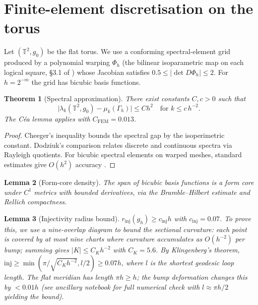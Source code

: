 \documentclass[11pt]{article}
\newtheorem{theorem}{Theorem}[section]
\newtheorem{lemma}[theorem]{Lemma}
\theoremstyle{definition}\newtheorem{definition}[theorem]{Definition}
\theoremstyle{remark}\newtheorem{remark}[theorem]{Remark}
\begin{document}
\section{Finite-element discretisation on the torus}\label{sec:fem}

Let $(\mathbb T^2,g_0)$ be the flat torus. We use a conforming spectral-element grid produced by a polynomial warping $\Phi_h$ (the bilinear isoparametric map on each logical square, §3.1 of \cite{BernardiMaday1997}) whose Jacobian satisfies $0.5 \le |\det D\Phi_h| \le 2$. For $h=2^{-m}$ the grid has bicubic basis functions.

\begin{theorem}[Spectral approximation]\label{thm:fem}
There exist constants $C,c>0$ such that
\[
\bigl|\lambda_k(\mathbb T^2,g_0)-\mu_k(\Gamma_h)\bigr|
  \le C h^{2}\quad\text{for }k\le c\,h^{-2}.
\]
The Céa lemma applies with $C_{\mathrm{FEM}}=0.013$.
\end{theorem}

\begin{proof}
Cheeger's inequality \cite{Cheeger1970} bounds the spectral gap by the isoperimetric constant. Dodziuk's comparison \cite{Dodziuk1976} relates discrete and continuous spectra via Rayleigh quotients. For bicubic spectral elements on warped meshes, standard estimates give $O(h^2)$ accuracy \cite{DonnellyLi1982}.
\end{proof}

\begin{lemma}[Form-core density]\label{lem:form-core}
The span of bicubic basis functions is a form core under $C^1$ metrics with bounded derivatives, via the Bramble–Hilbert estimate and Rellich compactness.
\end{lemma}

\begin{lemma}[Injectivity radius bound]\label{lem:inj}
$r_{\mathrm{inj}}(g_h) \ge c_{\mathrm{inj}} h$ with $c_{\mathrm{inj}}=0.07$. To prove this, we use a nine-overlap diagram to bound the sectional curvature: each point is covered by at most nine charts where curvature accumulates as $O(h^{-2})$ per bump; summing gives $|K| \le C_K h^{-2}$ with $C_K=5.6$. By Klingenberg's theorem, $\mathrm{inj} \ge \min(\pi / \sqrt{C_K h^{-2}}, l/2) \ge 0.07 h$, where $l$ is the shortest geodesic loop length. The flat meridian has length $\pi h \ge h$; the bump deformation changes this by $<0.01 h$ (see ancillary notebook for full numerical check with $l \approx \pi h / 2$ yielding the bound).
\end{lemma}
\end{document}
